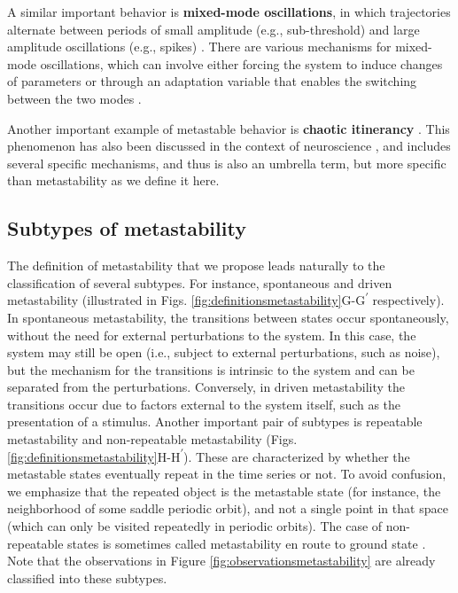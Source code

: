 \documentclass[reprint,superscriptaddress,showpacs,amsmath,amssymb,aps,floatfix,nolongbibliography]{revtex4-2}
\theoremstyle{definition}
\newcommand{\Emph}[1]{\textbf{#1}}
\newcommand*{\supprime}{\textsuperscript{\everymodeprime}\xspace}
\newcommand*{\everymodeprime}{\ensuremath{\prime}}
\begin{document}
A similar important behavior is \Emph{mixed-mode oscillations}, in which trajectories alternate between periods of small amplitude (e.g., sub-threshold) and large amplitude oscillations (e.g., spikes) \cite{rotstein2014mixedmode}. There are various mechanisms for mixed-mode oscillations, which can involve either forcing the system to induce changes of parameters or through an adaptation variable that enables the switching between the two modes \cite{desroches2012mixed, rotstein2014mixedmode}.

Another important example of metastable behavior is \Emph{chaotic itinerancy} \cite{kaneko2003chaotic}. This phenomenon has also been discussed in the context of neuroscience \cite{freeman2003evidence, tsuda2009hypotheses, tsuda2015chaotic}, and includes several specific mechanisms, and thus is also an umbrella term, but more specific than metastability as we define it here.


\subsection{Subtypes of metastability}
\label{sec:subtypes}
The definition of metastability that we propose leads naturally to the classification of several subtypes. For instance, spontaneous and driven metastability (illustrated in Figs. \ref{fig:definitionsmetastability}G-G\supprime respectively). In spontaneous metastability, the transitions between states occur spontaneously, without the need for external perturbations to the system. In this case, the system may still be open (i.e., subject to external perturbations, such as noise), but the mechanism for the transitions is intrinsic to the system and can be separated from the perturbations. Conversely, in driven metastability the transitions occur due to factors external to the system itself, such as the presentation of a stimulus. Another important pair of subtypes is repeatable metastability and non-repeatable metastability (Figs. \ref{fig:definitionsmetastability}H-H\supprime). These are characterized by whether the metastable states eventually repeat in the time series or not. To avoid confusion, we emphasize that the repeated object is the metastable state (for instance, the neighborhood of some saddle periodic orbit), and not a single point in that space (which can only be visited repeatedly in periodic orbits). The case of non-repeatable states is sometimes called metastability en route to ground state \cite{brinkman2022metastable}. Note that the observations in Figure \ref{fig:observationsmetastability} are already classified into these subtypes. 
\end{document}
